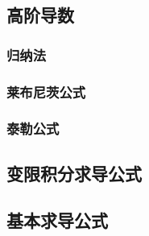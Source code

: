 \documentclass[UTF8]{ctexart}
\begin{document}
\subsection{高阶导数}
\subsubsection{归纳法}
\subsubsection{莱布尼茨公式}
\subsubsection{泰勒公式}
\subsection{变限积分求导公式}
\subsection{基本求导公式}
\end{document}
